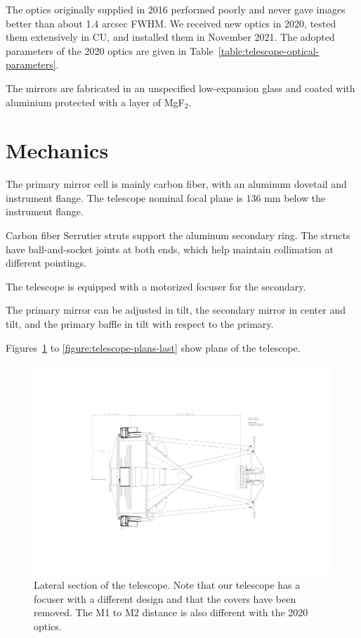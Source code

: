 The optics originally supplied in 2016 performed poorly and never gave images better than about 1.4 arcsec FWHM. We received new optics in 2020, tested them extensively in CU, and installed them in November 2021. The adopted parameters of the 2020 optics are given in Table~\ref{table:telescope-optical-parameters}. 

The mirrors are fabricated in an unspecified low-expansion glass and coated with aluminium protected with a layer of MgF$_2$.

\section{Mechanics}

The primary mirror cell is mainly carbon fiber, with an aluminum dovetail and instrument flange. The telescope nominal focal plane is 136 mm below the instrument flange.

Carbon fiber Serrutier struts support the aluminum secondary ring. The structs have ball-and-socket joints at both ends, which help maintain collimation at different pointings. 

The telescope is equipped with a motorized focuser for the secondary. 

The primary mirror can be adjusted in tilt, the secondary mirror in center and tilt, and the primary baffle in tilt with respect to the primary. 

Figures~\ref{figure:telescope-plans-first} to \ref{figure:telescope-plans-last} show plans of the telescope.

\begin{figure}
\begin{center}
\includegraphics[height=0.9\linewidth,angle=90]{figures/telescope-lateral-section.pdf}
\end{center}
\caption{Lateral section of the telescope. Note that our telescope has a focuser with a different design and that the covers have been removed. The M1 to M2 distance is also different with the 2020 optics.}
\label{figure:telescope-plans-first}
\end{figure}

